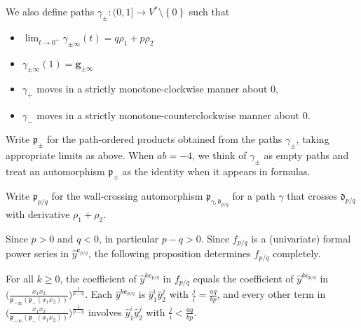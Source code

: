\documentclass[ALCO,ThmDefs,Unicode,epreuves]{cedram}
\newcommand{\set}[1]{{\left\lbrace #1 \right\rbrace}}
\newcommand{\p}{{\mathfrak p}}
\newcommand{\g}{\mathbf{g}}
\newcommand{\cc}{\mathbf{c}}
\renewcommand{\d}{{\mathfrak d}}
\newcommand{\hy}{\hat{y}}
\begin{document}
We also define paths $\gamma_\pm:(0,1]\to V^*\setminus\set{0}$ such that
\begin{itemize} 
\item $\lim_{t\to0^+}\gamma_{\pm\infty}(t)=q\rho_1+p\rho_2$
\item $\gamma_{\pm\infty}(1)=\g_{\pm\infty}$
\item $\gamma_+$ moves in a strictly monotone-clockwise manner about $0$,
\item $\gamma_-$ moves in a strictly monotone-counterclockwise manner about $0$.
\end{itemize}
Write $\p_\pm$ for the path-ordered products obtained from the paths $\gamma_\pm$, taking appropriate limits as above.
When $ab=-4$, we think of $\gamma_\pm$ as empty paths and treat an automorphism $\p_\pm$ as the identity when it appears in formulas.

Write $\p_{p/q}$ for the wall-crossing automorphism $\p_{\gamma,\d_{p/q}}$ for a path $\gamma$ that crosses $\d_{p/q}$ with derivative $\rho_1+\rho_2$.

Since $p>0$ and $q<0$, in particular $p-q>0$.
Since $f_{p/q}$ is a (univariate) formal power series in $\hy^{\cc_{p/q}}$, the following proposition determines $f_{p/q}$ completely.

\begin{prop}\label{diagonal terms ba}
For all $k\ge0$, the coefficient of $\hy^{k\cc_{p/q}}$ in $f_{p/q}$ equals the coefficient of $\hy^{k\cc_{p/q}}$ in $\bigl(\frac{x_1x_2}{\p_{-\infty}(\p_-(x_1x_2))}\bigr)^{\frac1{p-q}}$.
Each $\hy^{k\cc_{p/q}}$ is $\hy_1^i\hy_2^j$ with $\frac ji=\frac{aq}{bp}$, and every other term in $\bigl(\frac{x_1x_2}{\p_{-\infty}(\p_-(x_1x_2))}\bigr)^{\frac1{p-q}}$ involves $\hy_1^i\hy_2^j$ with $\frac ji<\frac{aq}{bp}$.
\end{prop}
\end{document}
